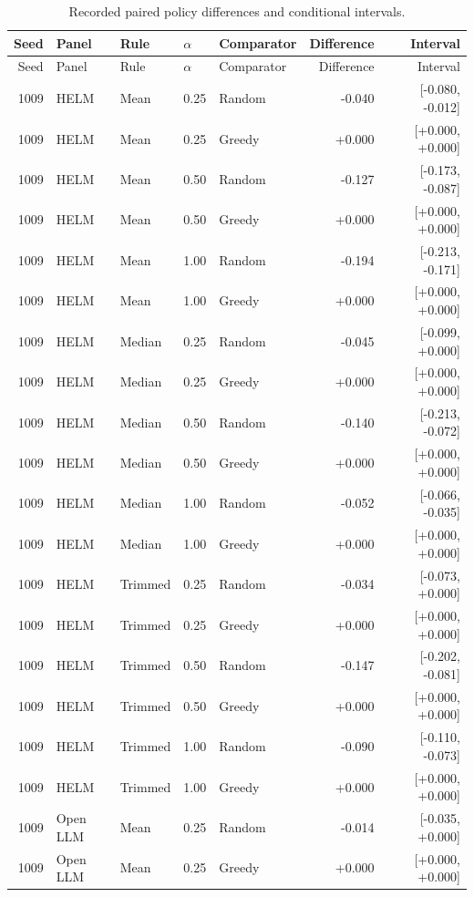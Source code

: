 \documentclass{article}
\begin{document}
\begin{longtable}{rlll lrr}
\caption{Recorded paired policy differences and conditional intervals.}\label{tab:intervals}\\
\toprule Seed & Panel & Rule & $\alpha$ & Comparator & Difference & Interval\\\midrule
\endfirsthead
\toprule Seed & Panel & Rule & $\alpha$ & Comparator & Difference & Interval\\\midrule
\endhead
1009 & HELM & Mean & 0.25 & Random & -0.040 & [-0.080, -0.012] \\
1009 & HELM & Mean & 0.25 & Greedy & +0.000 & [+0.000, +0.000] \\
1009 & HELM & Mean & 0.50 & Random & -0.127 & [-0.173, -0.087] \\
1009 & HELM & Mean & 0.50 & Greedy & +0.000 & [+0.000, +0.000] \\
1009 & HELM & Mean & 1.00 & Random & -0.194 & [-0.213, -0.171] \\
1009 & HELM & Mean & 1.00 & Greedy & +0.000 & [+0.000, +0.000] \\
1009 & HELM & Median & 0.25 & Random & -0.045 & [-0.099, +0.000] \\
1009 & HELM & Median & 0.25 & Greedy & +0.000 & [+0.000, +0.000] \\
1009 & HELM & Median & 0.50 & Random & -0.140 & [-0.213, -0.072] \\
1009 & HELM & Median & 0.50 & Greedy & +0.000 & [+0.000, +0.000] \\
1009 & HELM & Median & 1.00 & Random & -0.052 & [-0.066, -0.035] \\
1009 & HELM & Median & 1.00 & Greedy & +0.000 & [+0.000, +0.000] \\
1009 & HELM & Trimmed & 0.25 & Random & -0.034 & [-0.073, +0.000] \\
1009 & HELM & Trimmed & 0.25 & Greedy & +0.000 & [+0.000, +0.000] \\
1009 & HELM & Trimmed & 0.50 & Random & -0.147 & [-0.202, -0.081] \\
1009 & HELM & Trimmed & 0.50 & Greedy & +0.000 & [+0.000, +0.000] \\
1009 & HELM & Trimmed & 1.00 & Random & -0.090 & [-0.110, -0.073] \\
1009 & HELM & Trimmed & 1.00 & Greedy & +0.000 & [+0.000, +0.000] \\
1009 & Open LLM & Mean & 0.25 & Random & -0.014 & [-0.035, +0.000] \\
1009 & Open LLM & Mean & 0.25 & Greedy & +0.000 & [+0.000, +0.000] \\

\end{longtable}
\end{document}
